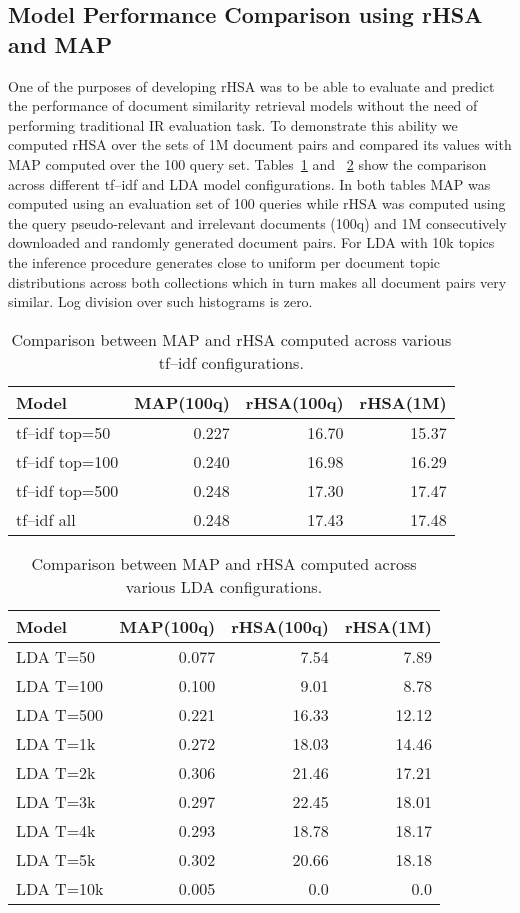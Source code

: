 \documentclass[letterpaper]{article}
\begin{document}
\subsection{Model Performance Comparison using rHSA and MAP}\label{hsa_map}

One of the purposes of developing rHSA was to be able to evaluate and predict the performance of document similarity retrieval models without the need of performing traditional IR evaluation task. To demonstrate this ability we computed rHSA over the sets of 1M document pairs and compared its values with MAP computed over the 100 query set. Tables~\ref{tab:map_hsa_tfidf} and ~\ref{tab:map_hsa_lda} show the comparison across different tf--idf and LDA model configurations. In both tables MAP was computed using an evaluation set of 100 queries while rHSA was computed using the query pseudo-relevant and irrelevant documents (100q) and 1M consecutively downloaded and randomly generated document pairs. For LDA with 10k topics the inference procedure generates close to uniform per document topic distributions across both collections which in turn makes all document pairs very similar. Log division over such histograms is zero. 

\begin{table}
  \centering
  \begin{tabular}{|l |r| r |r|}
	 \hline
    Model & MAP(100q) & rHSA(100q) & rHSA(1M)\\
		\hline
		tf--idf top=50 & 0.227 & 16.70 & 15.37\\ 
		tf--idf top=100 & 0.240 & 16.98 & 16.29\\ 
		tf--idf top=500 & 0.248 & 17.30 & 17.47\\ 
		tf--idf all & 0.248 & 17.43 & 17.48\\ 
		\hline
  \end{tabular}
  \caption{Comparison between MAP and rHSA computed across various tf--idf configurations.}
  \label{tab:map_hsa_tfidf}
\end{table}

\begin{table}
  \centering
  \begin{tabular}{|l |r |r |r|}
	 \hline
    Model & MAP(100q) & rHSA(100q) & rHSA(1M)\\
		\hline
		LDA T=50 & 0.077 & 7.54 & 7.89 \\
		LDA T=100 & 0.100 & 9.01 & 8.78\\
		LDA T=500 & 0.221 & 16.33 & 12.12\\
		LDA T=1k & 0.272 & 18.03 & 14.46\\
		LDA T=2k & 0.306 & 21.46 & 17.21\\
		LDA T=3k & 0.297 & 22.45 & 18.01\\
		LDA T=4k & 0.293 & 18.78 & 18.17\\
		LDA T=5k & 0.302 & 20.66 & 18.18\\
		LDA T=10k & 0.005 & 0.0 & 0.0\\
		\hline
  \end{tabular}
  \caption{Comparison between MAP and rHSA computed across various LDA configurations.}
  \label{tab:map_hsa_lda}
\end{table}
\end{document}
